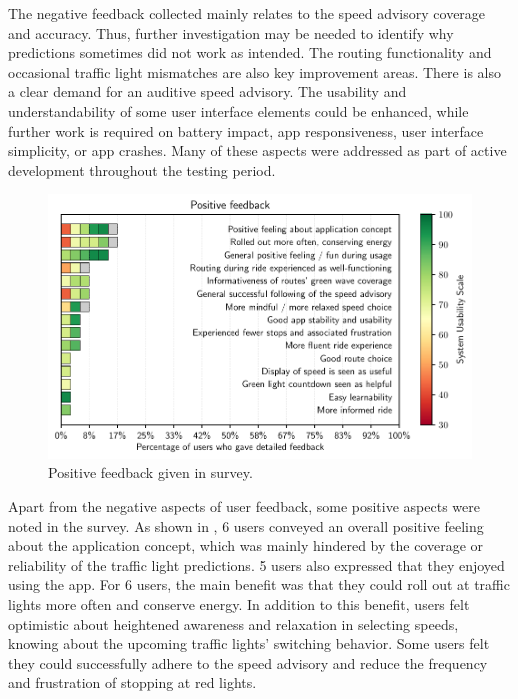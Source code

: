 The negative feedback collected mainly relates to the speed advisory coverage and accuracy. Thus, further investigation may be needed to identify why predictions sometimes did not work as intended. The routing functionality and occasional traffic light mismatches are also key improvement areas. There is also a clear demand for an auditive speed advisory. The usability and understandability of some user interface elements could be enhanced, while further work is required on battery impact, app responsiveness, user interface simplicity, or app crashes. Many of these aspects were addressed as part of active development throughout the testing period.

\begin{figure}[t]
\caption{Positive feedback given in survey.}\label{fig:app-positive-feedback}
\includegraphics[width=\linewidth]{images/app-feedback-positive.pdf}
\end{figure}

Apart from the negative aspects of user feedback, some positive aspects were noted in the survey. As shown in , 6 users conveyed an overall positive feeling about the application concept, which was mainly hindered by the coverage or reliability of the traffic light predictions. 5 users also expressed that they enjoyed using the app. For 6 users, the main benefit was that they could roll out at traffic lights more often and conserve energy. In addition to this benefit, users felt optimistic about heightened awareness and relaxation in selecting speeds, knowing about the upcoming traffic lights' switching behavior. Some users felt they could successfully adhere to the speed advisory and reduce the frequency and frustration of stopping at red lights.

